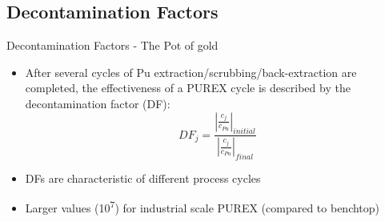 \documentclass{beamer}
\newcommand{\tss}{\textsuperscript}
\begin{document}
\subsection{Decontamination Factors}
\begin{frame}{Decontamination Factors - The Pot of gold}
  \begin{itemize}
  \item{After several cycles of Pu extraction/scrubbing/back-extraction
    are completed, the effectiveness of a PUREX cycle is described
    by the decontamination factor (DF):}
    \begin{equation*}
      DF_j=\frac{\left|\frac{c_j}{c_{Pu}}\right|_{initial}}
      {\left|\frac{c_j}{c_{Pu}}\right|_{final}}
    \end{equation*}
  \item{DFs are characteristic of different process cycles}
  \item{Larger values (10\tss{7}) for industrial scale PUREX (compared
  to benchtop)\tss{\cite{stoller1961reactor,benedict1982nuclear}}}
  \end{itemize}
\end{frame}



\end{document}
